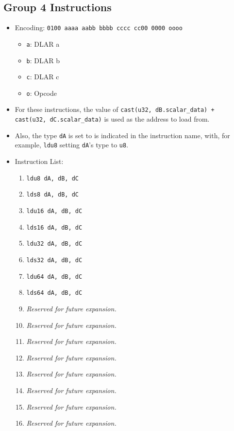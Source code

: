 \documentclass{article}
\begin{document}
	\subsection{Group 4 Instructions}
		\begin{itemize}
		\item Encoding: \texttt{0100 aaaa aabb bbbb  cccc cc00 0000 oooo}
			\begin{itemize}
			\item \texttt{a}: DLAR a
			\item \texttt{b}: DLAR b
			\item \texttt{c}: DLAR c
			\item \texttt{o}: Opcode
			\end{itemize}
		\item For these instructions, the value of
			\texttt{cast(u32, dB.scalar\_data)
				+ cast(u32, dC.scalar\_data)}
			is used as the address to load from.
		\item Also, the type \texttt{dA} is set to is indicated in the
			instruction name, with, for example, \texttt{ldu8} setting
			\texttt{dA}'s type to \texttt{u8}.
		\item Instruction List:
			\begin{enumerate}
			\item \texttt{ldu8 dA, dB, dC}
			\item \texttt{lds8 dA, dB, dC}
			\item \texttt{ldu16 dA, dB, dC}
			\item \texttt{lds16 dA, dB, dC}

			\item \texttt{ldu32 dA, dB, dC}
			\item \texttt{lds32 dA, dB, dC}
			\item \texttt{ldu64 dA, dB, dC}
			\item \texttt{lds64 dA, dB, dC}

			\item \textit{Reserved for future expansion.}
			\item \textit{Reserved for future expansion.}
			\item \textit{Reserved for future expansion.}
			\item \textit{Reserved for future expansion.}

			\item \textit{Reserved for future expansion.}
			\item \textit{Reserved for future expansion.}
			\item \textit{Reserved for future expansion.}
			\item \textit{Reserved for future expansion.}
			\end{enumerate}
		\end{itemize}
		\newpage
\end{document}
